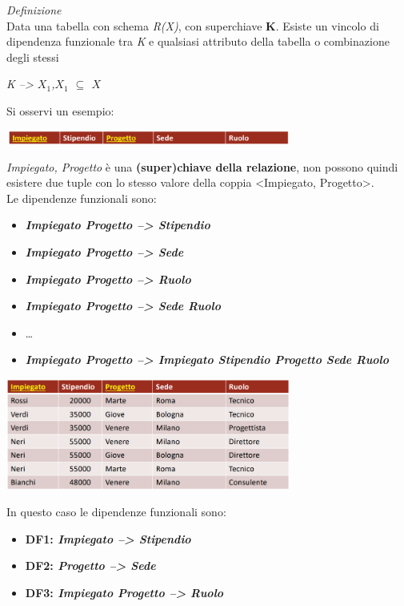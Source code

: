 \documentclass{article}
\begin{document}
\textit{Definizione}\\
Data una tabella con schema \textit{R(X)}, con superchiave \textbf{K}. Esiste un vincolo di dipendenza funzionale tra \textit{K} e qualsiasi attributo della tabella o combinazione degli stessi
\begin{center}
    \textit{K --> $X_1$,\quad $X_1$ $\subseteq$ $X$}\\
\end{center}
Si osservi un esempio:
\begin{center}
    \includegraphics[width=0.7\textwidth]{foto 3.png}
\end{center}
\textit{Impiegato, Progetto} è una \textbf{(super)chiave della relazione}, non possono quindi esistere due tuple con lo stesso valore della coppia <Impiegato, Progetto>.\\
Le dipendenze funzionali sono:
\begin{itemize}[label={-}, leftmargin=1cm]
    \itemsep0em
    \item \textbf{\textit{Impiegato Progetto --> Stipendio}}
    \item \textbf{\textit{Impiegato Progetto --> Sede}}
    \item \textbf{\textit{Impiegato Progetto --> Ruolo}}
    \item \textbf{\textit{Impiegato Progetto --> Sede Ruolo}}
    \item \dots
    \item \textbf{\textit{Impiegato Progetto --> Impiegato Stipendio Progetto Sede Ruolo}}
\end{itemize}
\begin{center}
    \includegraphics[width=0.7\textwidth]{foto 4.png}
\end{center}
In questo caso le dipendenze funzionali sono:
\begin{itemize}[label={-}, leftmargin=1cm]
    \itemsep0em
    \item \textbf{DF1: \textit{Impiegato --> Stipendio}}
    \item \textbf{DF2: \textit{Progetto --> Sede}}
    \item \textbf{DF3: \textit{Impiegato Progetto --> Ruolo}}
\end{itemize}
\end{document}
